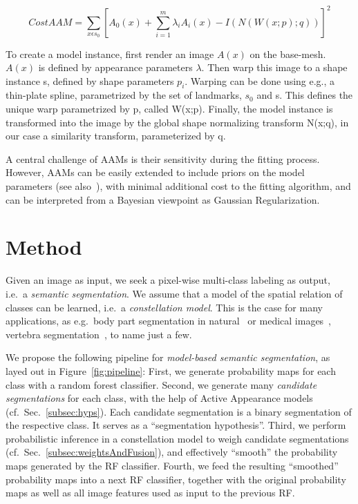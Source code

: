 \documentclass[10pt,twocolumn,letterpaper]{article}
\begin{document}
\begin{equation}
CostAAM = \sum_{x \epsilon s_0} [A_0(x) + \sum_{i=1}^m \lambda_i A_i(x) - I(N(W(x;p);q))]^2
\label{eq:costAAM}
\end{equation} 

To create a model instance, first render an image $A(x)$ on the base-mesh. $A(x)$ is defined by appearance parameters $\lambda$. Then warp this image to a shape instance s, defined by shape parameters $p_i$.  Warping can be done using e.g., a thin-plate spline, parametrized by the set of landmarks, $s_0$ and s. This defines the unique warp parametrized by p, called W(x;p).  Finally, the model instance is transformed into the image by the global shape normalizing transform N(x;q), in our case a similarity transform, parameterized by q.

A central challenge of AAMs is their sensitivity during the fitting process. 
However, AAMs can be easily extended to include priors on the model parameters (see also~\cite{BakerAAM2004}), with minimal additional cost to the fitting algorithm, and can be interpreted from a Bayesian viewpoint as Gaussian Regularization.
%



\section{Method}
\label{sec:method}
Given an image as input, we seek a pixel-wise multi-class labeling as output, i.e.\ a \emph{semantic segmentation}. 
%
We assume that a model of the spatial relation of classes can be learned, i.e.\ a \emph{constellation model}. This is the case for many applications, as e.g.\ body part segmentation in natural~\cite{PoseMachinesECCV2014} or medical images~\cite{SeifertAnatomicalSPIE2009}, vertebra segmentation~\cite{Glocker2012,Glocker2013}, to name just a few. 
%

We propose the following pipeline for \emph{model-based semantic segmentation}, as layed out in Figure~\ref{fig:pipeline}: 
%
First, we generate probability maps for each class with a random forest classifier.
%
Second, we generate many \emph{candidate segmentations} for each class, with the help of Active Appearance models (cf.\ Sec.\ \ref{subsec:hyps}). 
Each candidate segmentation is a binary segmentation of the respective class. It serves as a ``segmentation hypothesis''. 
%
Third, we perform probabilistic inference in a constellation model to weigh candidate segmentations (cf.\ Sec.\ \ref{subsec:weightsAndFusion}), and effectively ``smooth'' the probability maps generated by the RF classifier.  
%
Fourth, we feed the resulting ``smoothed'' probability maps into a next RF classifier, together with the original probability maps as well as all image features used as input to the previous RF. 
\end{document}
